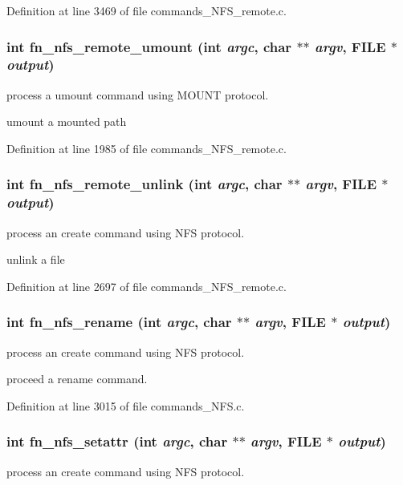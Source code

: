 Definition at line 3469 of file commands\_\-NFS\_\-remote.c.
\subsubsection[{fn\_\-nfs\_\-remote\_\-umount}]{\setlength{\rightskip}{0pt plus 5cm}int fn\_\-nfs\_\-remote\_\-umount (int {\em argc}, \/  char $\ast$$\ast$ {\em argv}, \/  FILE $\ast$ {\em output})}\label{commands_8h_a70c8c0f939759e036b0dd786623f942c}
process a umount command using MOUNT protocol.

umount a mounted path 

Definition at line 1985 of file commands\_\-NFS\_\-remote.c.
\subsubsection[{fn\_\-nfs\_\-remote\_\-unlink}]{\setlength{\rightskip}{0pt plus 5cm}int fn\_\-nfs\_\-remote\_\-unlink (int {\em argc}, \/  char $\ast$$\ast$ {\em argv}, \/  FILE $\ast$ {\em output})}\label{commands_8h_ae7889c63ec94ea9fabfe222ef77f734f}
process an create command using NFS protocol.

unlink a file 

Definition at line 2697 of file commands\_\-NFS\_\-remote.c.
\subsubsection[{fn\_\-nfs\_\-rename}]{\setlength{\rightskip}{0pt plus 5cm}int fn\_\-nfs\_\-rename (int {\em argc}, \/  char $\ast$$\ast$ {\em argv}, \/  FILE $\ast$ {\em output})}\label{commands_8h_a29f386c1c9b5e0de5c8e9c35993e683f}
process an create command using NFS protocol.

proceed a rename command. 

Definition at line 3015 of file commands\_\-NFS.c.
\subsubsection[{fn\_\-nfs\_\-setattr}]{\setlength{\rightskip}{0pt plus 5cm}int fn\_\-nfs\_\-setattr (int {\em argc}, \/  char $\ast$$\ast$ {\em argv}, \/  FILE $\ast$ {\em output})}\label{commands_8h_aca7fba47173c3eac4e4d16f13a439533}
process an create command using NFS protocol.

